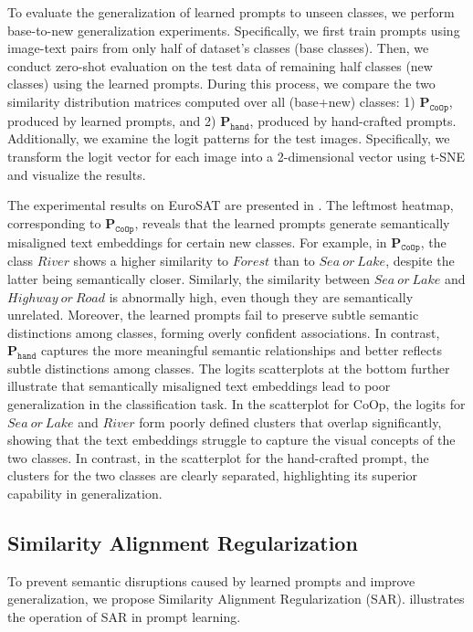  To evaluate the generalization of learned prompts to unseen classes, we perform base-to-new generalization experiments. Specifically, we first train prompts using image-text pairs from only half of dataset's classes (base classes). Then, we conduct zero-shot evaluation on the test data of remaining half classes (new classes) using the learned prompts. During this process, we compare the two similarity distribution matrices computed over all (base+new) classes: 1) $\mathbf{P}_{\mathtt{CoOp}}$, produced by learned prompts, and 2) $\mathbf{P}_{\mathtt{hand}}$, produced by hand-crafted prompts. Additionally, we examine the logit patterns for the test images. Specifically, we transform the logit vector for each image into a 2-dimensional vector using t-SNE \cite{van2008visualizing} and visualize the results.

The experimental results on EuroSAT \cite{helber2019eurosat} are presented in . The leftmost heatmap, corresponding to $\mathbf{P}_{\mathtt{CoOp}}$, reveals that the learned prompts generate semantically misaligned text embeddings for certain new classes. For example, in $\mathbf{P}_{\mathtt{CoOp}}$, the class $River$ shows a higher similarity to $Forest$ than to $Sea\ or\ Lake$, despite the latter being semantically closer. Similarly, the similarity between $Sea\ or\ Lake$ and $Highway\ or\ Road$ is abnormally high, even though they are semantically unrelated. Moreover, the learned prompts fail to preserve subtle semantic distinctions among classes, forming overly confident associations. In contrast, $\mathbf{P}_{\mathtt{hand}}$ captures the more meaningful semantic relationships and better reflects subtle distinctions among classes. The logits scatterplots at the bottom further illustrate that semantically misaligned text embeddings lead to poor generalization in the classification task. In the scatterplot for CoOp, the logits for $Sea\ or\ Lake$ and $River$ form poorly defined clusters that overlap significantly, showing that the text embeddings struggle to capture the visual concepts of the two classes. In contrast, in the scatterplot for the hand-crafted prompt, the clusters for the two classes are clearly separated, highlighting its superior capability in generalization.

\subsection{Similarity Alignment Regularization}
To prevent semantic disruptions caused by learned prompts and improve generalization, we propose Similarity Alignment Regularization (SAR).  illustrates the operation of SAR in prompt learning.

